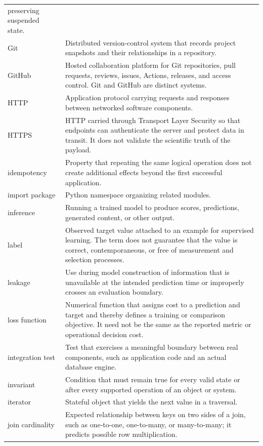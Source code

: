 \begin{longtable}{@{}p{}p{}@{}}
preserving suspended state. \\
Git & Distributed version-control system that records project snapshots and
their relationships in a repository. \\
GitHub & Hosted collaboration platform for Git repositories, pull requests,
reviews, issues, Actions, releases, and access control. Git and GitHub are
distinct systems. \\
HTTP & Application protocol carrying requests and responses between networked
software components. \\
HTTPS & HTTP carried through Transport Layer Security so that endpoints can
authenticate the server and protect data in transit. It does not validate the
scientific truth of the payload. \\
idempotency & Property that repeating the same logical operation does not create
additional effects beyond the first successful application. \\
import package & Python namespace organizing related modules. \\
inference & Running a trained model to produce scores, predictions, generated
content, or other output. \\
label & Observed target value attached to an example for supervised learning.
The term does not guarantee that the value is correct, contemporaneous, or free
of measurement and selection processes. \\
leakage & Use during model construction of information that is unavailable at
the intended prediction time or improperly crosses an evaluation boundary. \\
loss function & Numerical function that assigns cost to a prediction and target
and thereby defines a training or comparison objective. It need not be the same
as the reported metric or operational decision cost. \\
integration test & Test that exercises a meaningful boundary between real
components, such as application code and an actual database engine. \\
invariant & Condition that must remain true for every valid state or after every
supported operation of an object or system. \\
iterator & Stateful object that yields the next value in a traversal. \\
join cardinality & Expected relationship between keys on two sides of a join,
such as one-to-one, one-to-many, or many-to-many; it predicts possible row
multiplication. \\

\end{longtable}
